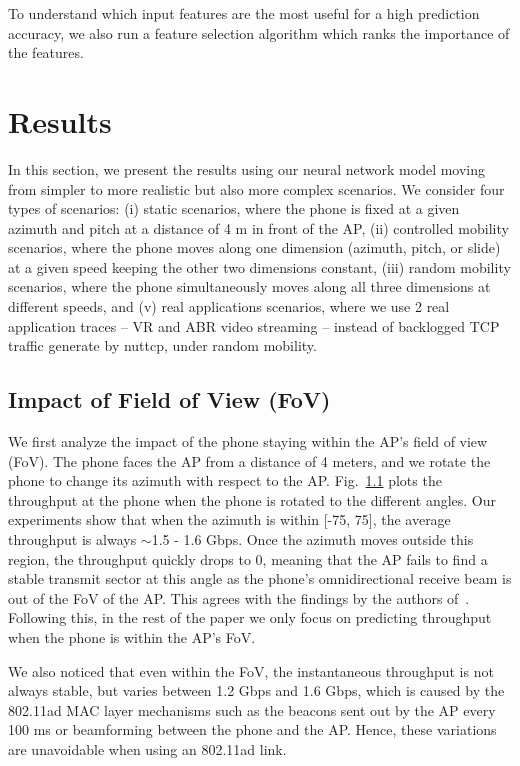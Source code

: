 \documentclass[sigconf,anonymous]{acmart}
\begin{document}
To understand which input features are the most useful for a high prediction accuracy, we also run a feature selection algorithm which ranks the importance of the features.

\section{Results} %
\label{section: Results}

In this section, we present the results using our neural network model moving from simpler to more realistic but also more complex scenarios. We consider four types of scenarios: (i) static scenarios, where the phone is fixed at a given azimuth and pitch at a distance of 4 m in front of the AP, (ii) controlled mobility scenarios, where the phone moves along one dimension (azimuth, pitch, or slide) at a given speed keeping the other two dimensions constant, (iii) random mobility scenarios, where the phone simultaneously moves along all three dimensions at different speeds, and (v) real applications scenarios, where we use 2 real application traces -- VR and ABR video streaming -- instead of backlogged TCP traffic generate by nuttcp, under random mobility. 

\subsection{Impact of Field of View (FoV)}

We first analyze the impact of the phone staying within the AP's field of view (FoV). The phone faces the AP from a distance of 4 meters, and we rotate the phone to change its azimuth with respect to the AP. Fig.~\ref{} plots the throughput at the phone when the phone is rotated to the different angles. Our experiments show that when the azimuth is within [-75\degree, 75\degree], the average throughput is always $\sim$1.5 - 1.6 Gbps. Once the azimuth moves outside this region, the throughput quickly drops to 0, meaning that the AP fails to find a stable transmit sector at this angle as the phone's omnidirectional receive beam is out of the FoV of the AP. This agrees with the findings by the authors of~\cite{wei:mobicom2017}. Following this, in the rest of the paper we only focus on predicting throughput when the phone is within the AP's FoV.

We also noticed that even within the FoV, the instantaneous throughput is not always stable, but varies between 1.2 Gbps and 1.6 Gbps, which is caused by the 802.11ad MAC layer mechanisms such as the beacons sent out by the AP every 100 ms or beamforming between the phone and the AP. Hence, these variations are unavoidable when using an 802.11ad link.
\end{document}
